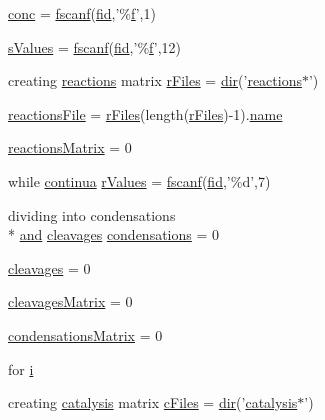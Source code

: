 \begin{DoxyCompactItemize}
\item 
\hyperlink{a00027_a941dee33725f074478fdcbf15e1c35ae}{conc} = \hyperlink{a00025_a028ac102a731e62fb0a7439381f566c1}{fscanf}(\hyperlink{a00031_ae9011d40c6f13e68e6f07156e0da7c5d}{fid},'\%\hyperlink{a00025_a9c5a71c46b1abb8b7df5ebeac6c81535}{f}',1)
\item 
\hyperlink{a00027_a02a2184ac978f50472408ca644862302}{s\+Values} = \hyperlink{a00025_a028ac102a731e62fb0a7439381f566c1}{fscanf}(\hyperlink{a00031_ae9011d40c6f13e68e6f07156e0da7c5d}{fid},'\%\hyperlink{a00025_a9c5a71c46b1abb8b7df5ebeac6c81535}{f}',12)
\item 
creating \hyperlink{a00020}{reactions} matrix \hyperlink{a00027_ad75735665492cabd747370126464fddf}{r\+Files} = \hyperlink{a00113_a4ca269cf93df1b512b52174c1a256fe5}{dir}('\hyperlink{a00020}{reactions}$\ast$')
\item 
\hyperlink{a00027_a4c72dba1fe2ee2fbcc699262a8d0c624}{reactions\+File} = \hyperlink{a00030_ad75735665492cabd747370126464fddf}{r\+Files}(length(\hyperlink{a00030_ad75735665492cabd747370126464fddf}{r\+Files})-\/1).\hyperlink{a00027_abbf559a76fab59203496b0847ab9502a}{name}
\item 
\hyperlink{a00027_ac52097a2745fcef31eb175d2e9485845}{reactions\+Matrix} = 0
\item 
while \hyperlink{a00030_a9c951ebd5bc3f1adce943bee1255f4d6}{continua} \hyperlink{a00027_a436a6968124e560649654a4abbd9dac6}{r\+Values} = \hyperlink{a00025_a028ac102a731e62fb0a7439381f566c1}{fscanf}(\hyperlink{a00031_ae9011d40c6f13e68e6f07156e0da7c5d}{fid},'\%d',7)
\item 
dividing into condensations \\*
\hyperlink{a00028_a170f8acb213f91bf71c77b1d20bceb33}{and} \hyperlink{a00030_a89060c6979e5a4ff7b0985b35f295695}{cleavages} \hyperlink{a00027_ad3aa27d88a7e9d77d8334155860269bb}{condensations} = 0
\item 
\hyperlink{a00027_a89060c6979e5a4ff7b0985b35f295695}{cleavages} = 0
\item 
\hyperlink{a00027_a1a691fb4f955887edfa538e91479fafe}{cleavages\+Matrix} = 0
\item 
\hyperlink{a00027_afaba8eef2f8f4e4dda2e893a19e55a94}{condensations\+Matrix} = 0
\item 
for \hyperlink{a00027_a1de1a45bc56b002aa1ad94bb5f54a1ca}{i}
\item 
creating \hyperlink{a00011}{catalysis} matrix \hyperlink{a00027_a9eab57ccb42a39c704f47dc30e4f4515}{c\+Files} = \hyperlink{a00113_a4ca269cf93df1b512b52174c1a256fe5}{dir}('\hyperlink{a00011}{catalysis}$\ast$')

\end{DoxyCompactItemize}
